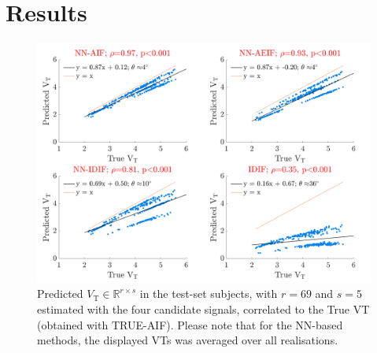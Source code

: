     \section{Results} \label{sec:a_bayesian_neural_network-based_method_for_the_extraction_of_a_metabolite_corrected_arterial_input_function_from_dynamic_pbr28_pet_appendix_results}
        \begin{figure}
            \centering
            
            \includegraphics[width=1.0\linewidth]{figures/arterial_input_function_correlation.png}
            
            \captionsetup{singlelinecheck=false, justification=centering}
            \caption{
                Predicted $V_{\mathrm{T}} \in \mathbb{R}^{r \times s}$ in the test-set subjects, with $r = 69$ and $s=5$ estimated with the four candidate signals, correlated to the True \gls{VT} (obtained with TRUE-\gls{AIF}). Please note that for the \gls{NN}-based methods, the displayed \glspl{VT} was averaged over all realisations.
            }
            \label{fig:a_bayesian_neural_network-based_method_for_the_extraction_of_a_metabolite_corrected_arterial_input_function_from_dynamic_pbr28_pet_appendix_results_correlation}
       \end{figure}
    
